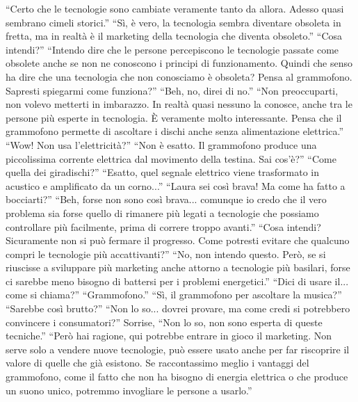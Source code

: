 \begin{dialogue}
 \enquote{Certo che le tecnologie sono cambiate veramente tanto da allora. Adesso quasi sembrano cimeli storici.}
 \enquote{Sì, è vero, la tecnologia sembra diventare obsoleta in fretta, ma in realtà è il marketing della tecnologia che diventa obsoleto.}
 \enquote{Cosa intendi?}
 \enquote{Intendo dire che le persone percepiscono le tecnologie passate come obsolete anche se non ne conoscono i principi di funzionamento. Quindi che senso ha dire che una tecnologia che non conosciamo è obsoleta? Pensa al grammofono. Sapresti spiegarmi come funziona?}
 \enquote{Beh, no, direi di no.}
 \enquote{Non preoccuparti, non volevo metterti in imbarazzo. In realtà quasi nessuno la conosce, anche tra le persone più esperte in tecnologia. È veramente molto interessante. Pensa che il grammofono permette di ascoltare i dischi anche senza alimentazione elettrica.}
 \enquote{Wow! Non usa l'elettricità?}
 \enquote{Non è esatto. Il grammofono produce una piccolissima corrente elettrica dal movimento della testina. Sai cos'è?}
 \enquote{Come quella dei giradischi?}
 \enquote{Esatto, quel segnale elettrico viene trasformato in acustico e amplificato da un corno...}
 \enquote{Laura sei così brava! Ma come ha fatto a bocciarti?}
 \enquote{Beh, forse non sono così brava... comunque io credo che il vero problema sia forse quello di rimanere più legati a tecnologie che possiamo controllare più facilmente, prima di correre troppo avanti.}
 \enquote{Cosa intendi? Sicuramente non si può fermare il progresso. Come potresti evitare che qualcuno compri le tecnologie più accattivanti?}
 \enquote{No, non intendo questo. Però, se si riuscisse a sviluppare più marketing anche attorno a tecnologie più basilari, forse ci sarebbe meno bisogno di battersi per i problemi energetici.}
 \enquote{Dici di usare il... come si chiama?}
 \enquote{Grammofono.}
 \enquote{Sì, il grammofono per ascoltare la musica?}
 \enquote{Sarebbe così brutto?}
 \enquote{Non lo so... dovrei provare, ma come credi si potrebbero convincere i consumatori?}
 Sorrise, \enquote{Non lo so, non sono esperta di queste tecniche.}
 \enquote{Però hai ragione,  qui potrebbe entrare in gioco il marketing. Non serve solo a vendere nuove tecnologie, può essere usato anche per far riscoprire il valore di quelle che già esistono. Se raccontassimo meglio i vantaggi del grammofono, come il fatto che non ha bisogno di energia elettrica o che produce un suono unico, potremmo invogliare le persone a usarlo.}

\end{dialogue}
